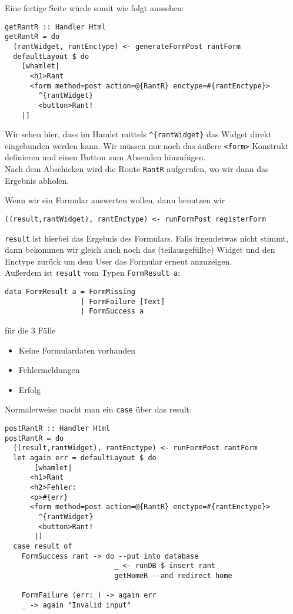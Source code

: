 \documentclass{beamer}
\begin{document}
\begin{frame}[fragile]
Eine fertige Seite würde somit wie folgt aussehen:
\begin{verbatim}
getRantR :: Handler Html
getRantR = do
  (rantWidget, rantEnctype) <- generateFormPost rantForm
  defaultLayout $ do
    [whamlet|
      <h1>Rant
      <form method=post action=@{RantR} enctype=#{rantEnctype}>
        ^{rantWidget}
        <button>Rant!
    |]
\end{verbatim}
\pause
Wir sehen hier, dass im Hamlet mittels \texttt{\textasciicircum\{rantWidget\}} das Widget direkt eingebunden werden kann. Wir müssen nur noch das äußere \texttt{<form>}-Konstrukt definieren und einen Button zum Absenden hinzufügen.\\\pause
Nach dem Abschicken wird die Route \texttt{RantR} aufgerufen, wo wir dann das Ergebnis abholen.

\end{frame}

\begin{frame}[fragile]
Wenn wir ein Formular auswerten wollen, dann benutzen wir
\begin{verbatim}
((result,rantWidget), rantEnctype) <- runFormPost registerForm
\end{verbatim}
\pause
\texttt{result} ist hierbei das Ergebnis des Formulars. Falls irgendetwas nicht stimmt, dann bekommen wir gleich auch noch das (teilausgefüllte) Widget und den Enctype zurück um dem User das Formular erneut anzuzeigen.\\\pause
Außerdem ist \texttt{result} vom Typen \texttt{FormResult a}:
\begin{verbatim}
data FormResult a = FormMissing
                  | FormFailure [Text]
                  | FormSuccess a
\end{verbatim}
\pause
für die 3 Fälle
\begin{itemize}
 \item Keine Formulardaten vorhanden
 \item Fehlermeldungen
 \item Erfolg
\end{itemize}
\end{frame}

\begin{frame}[fragile]
Normalerweise macht man ein \texttt{case} über das result:
\begin{verbatim}
postRantR :: Handler Html
postRantR = do
  ((result,rantWidget), rantEnctype) <- runFormPost rantForm
  let again err = defaultLayout $ do
       [whamlet|
      <h1>Rant
      <h2>Fehler:
      <p>#{err}
      <form method=post action=@{RantR} enctype=#{rantEnctype}>
        ^{rantWidget}
        <button>Rant!
       |]
  case result of
    FormSuccess rant -> do --put into database
                          _ <- runDB $ insert rant
                          getHomeR --and redirect home
                 
    FormFailure (err:_) -> again err
    _ -> again "Invalid input"
\end{verbatim}

\end{frame}
\end{document}
